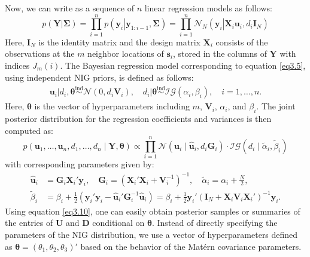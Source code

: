 \documentclass[twoside]{article}
\renewcommand{\/}[1]{\mathbf{\boldsymbol{#1}}}
\begin{document}
Now, we can write  as a sequence of $n$ linear regression models as follows:
\begin{equation}\label{eq3.5}
	p\left( \left. \mathbf{Y}\right| \mathbf{\Sigma}\right)
	=\prod_{i=1}^{n}p\left( \left. \mathbf{y}_i\right| \mathbf{y}_{1 \colon i-1}, \mathbf{\Sigma}\right) 
	= \prod_{i=1}^{n} \mathcal{N}_N\left( \left. \mathbf{y}_i\right| \mathbf{X}_i \mathbf{u}_i, d_i \mathbf{I}_N \right)
\end{equation}
Here, $\mathbf{I}_N$ is the identity matrix
 and the design matrix $\mathbf{X}_i$ consists
of the observations at the $m$ neighbor locations of $\/s_i$, stored in the columns of $\/Y$ with
indices $J_m(i)$. The Bayesian regression model corresponding to equation \eqref{eq3.5}, using independent NIG priors, is defined as follows:
\begin{equation}\label{eq3.9}
	\begin{split}
		\left.\mathbf{u}_i\right|d_i, \boldsymbol{\theta} \stackrel{\text{ind}}{\sim} \mathcal{N}\left(0, d_i \mathbf{V}_i \right), \quad 
		\left. d_i\right|\boldsymbol{\theta} \stackrel{\text{ind}}{\sim} \mathcal{IG}\left(\alpha_i, \beta_i \right), \quad 
		i = 1, \dots, n.
	\end{split}
\end{equation}
Here, $\boldsymbol{\theta}$ is the vector of hyperparameters including $m$, $\mathbf{V}_i$, $\alpha_i$, and $\beta_i$. The joint posterior distribution for the regression coefficients and variances is then computed as:
\begin{equation}\label{eq3.10}
	p(\mathbf{u}_1, \dots, \mathbf{u}_n, d_1, \dots, d_n \mid \mathbf{Y}, \boldsymbol{\theta}) \propto \prod_{i=1}^{n} \mathcal{N}(\mathbf{u}_i \mid \hat{\mathbf{u}}_i, d_i \mathbf{G}_i) 
	\cdot \mathcal{IG}(d_i \mid \tilde{\alpha}_i, \tilde{\beta}_i)
\end{equation}
with corresponding parameters given by:
\begin{align*}
	\hat{\mathbf{u}}_i &= \mathbf{G}_i \mathbf{X}_i' \mathbf{y}_i, \quad 
	\mathbf{G}_i = \left( \mathbf{X}_i' \mathbf{X}_i + \mathbf{V}_i^{-1} \right)^{-1}, \quad 
	\tilde{\alpha}_i = \alpha_i + \frac{N}{2}, \\
	\tilde{\beta}_i &= \beta_i + \frac{1}{2} \left( \mathbf{y}_i' \mathbf{y}_i - \hat{\mathbf{u}}_i' \mathbf{G}_i^{-1} \hat{\mathbf{u}}_i \right) 
	= \beta_i + \frac{1}{2} \mathbf{y}_i' \left( \mathbf{I}_N + \mathbf{X}_i \mathbf{V}_i \mathbf{X}_i' \right)^{-1} \mathbf{y}_i.
\end{align*}
Using equation \eqref{eq3.10}, one can easily obtain posterior samples or summaries of the entries of $\mathbf{U}$ and $\mathbf{D}$ conditional on $\boldsymbol{\theta}$. Instead of directly specifying the parameters of the NIG distribution, we use a vector of hyperparameters defined as $\boldsymbol{\theta}=(\theta_1, \theta_2, \theta_3)'$ based on the behavior of the Mat\'ern covariance parameters.
\end{document}
